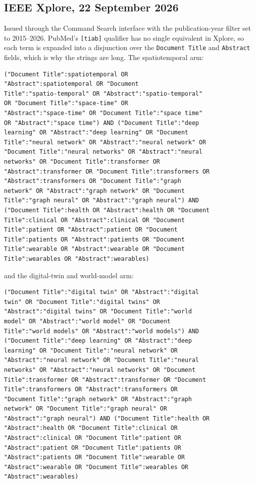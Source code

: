 \documentclass[journal]{IEEEtran}
\begin{document}
\subsection{IEEE Xplore, 22 September 2026}
Issued through the Command Search interface with the publication-year filter set
to 2015--2026. PubMed's \texttt{[tiab]} qualifier has no single equivalent
in Xplore, so each term is expanded into a disjunction over the
\texttt{Document Title} and \texttt{Abstract} fields, which is why the strings
are long. The spatiotemporal arm:

{\scriptsize\begin{verbatim}
("Document Title":spatiotemporal OR
"Abstract":spatiotemporal OR "Document
Title":"spatio-temporal" OR "Abstract":"spatio-temporal"
OR "Document Title":"space-time" OR
"Abstract":"space-time" OR "Document Title":"space time"
OR "Abstract":"space time") AND ("Document Title":"deep
learning" OR "Abstract":"deep learning" OR "Document
Title":"neural network" OR "Abstract":"neural network" OR
"Document Title":"neural networks" OR "Abstract":"neural
networks" OR "Document Title":transformer OR
"Abstract":transformer OR "Document Title":transformers OR
"Abstract":transformers OR "Document Title":"graph
network" OR "Abstract":"graph network" OR "Document
Title":"graph neural" OR "Abstract":"graph neural") AND
("Document Title":health OR "Abstract":health OR "Document
Title":clinical OR "Abstract":clinical OR "Document
Title":patient OR "Abstract":patient OR "Document
Title":patients OR "Abstract":patients OR "Document
Title":wearable OR "Abstract":wearable OR "Document
Title":wearables OR "Abstract":wearables)
\end{verbatim}}

\noindent and the digital-twin and world-model arm:

{\scriptsize\begin{verbatim}
("Document Title":"digital twin" OR "Abstract":"digital
twin" OR "Document Title":"digital twins" OR
"Abstract":"digital twins" OR "Document Title":"world
model" OR "Abstract":"world model" OR "Document
Title":"world models" OR "Abstract":"world models") AND
("Document Title":"deep learning" OR "Abstract":"deep
learning" OR "Document Title":"neural network" OR
"Abstract":"neural network" OR "Document Title":"neural
networks" OR "Abstract":"neural networks" OR "Document
Title":transformer OR "Abstract":transformer OR "Document
Title":transformers OR "Abstract":transformers OR
"Document Title":"graph network" OR "Abstract":"graph
network" OR "Document Title":"graph neural" OR
"Abstract":"graph neural") AND ("Document Title":health OR
"Abstract":health OR "Document Title":clinical OR
"Abstract":clinical OR "Document Title":patient OR
"Abstract":patient OR "Document Title":patients OR
"Abstract":patients OR "Document Title":wearable OR
"Abstract":wearable OR "Document Title":wearables OR
"Abstract":wearables)
\end{verbatim}}
\end{document}
